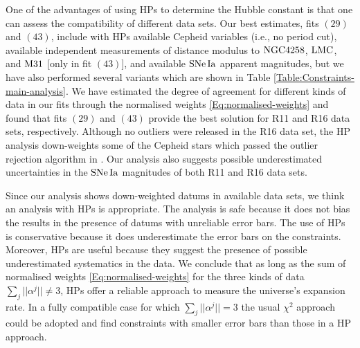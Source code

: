 One of the advantages of using HPs to determine the Hubble constant is that one can assess the compatibility of different data sets. Our best estimates, fits $(29)$ and $(43)$, include with HPs available Cepheid variables (i.e., no period cut), available independent measurements of distance modulus to $\mathrm{NGC4258}$, $\mathrm{LMC}$, and $\mathrm{M31}$ [only in fit $(43)$], and available $\mathrm{SNe\,Ia}$ apparent magnitudes, but we have also performed several variants which are shown in Table \ref{Table:Constraints-main-analysis}. %
We have estimated the degree of agreement for different kinds of data in our fits through the normalised weights \eqref{Eq:normalised-weights} and found that fits $(29)$ and $(43)$ provide the best solution for R11 and R16 data sets, respectively. Although no outliers were released in the R16 data set, the HP analysis down-weights some of the Cepheid stars which passed the outlier rejection algorithm in \cite{Riess:2016jrr}. Our analysis also suggests possible underestimated uncertainties in the $\mathrm{SNe\,Ia}$ magnitudes of both R11 and R16 data sets.   

Since our analysis shows down-weighted datums in available data sets, we think an analysis with HPs is appropriate. The analysis is safe because it does not bias the results in the presence of datums with unreliable error bars. The use of HPs is conservative because it does underestimate the error bars on the constraints. Moreover, HPs are useful because they suggest the presence of possible underestimated systematics in the data. We conclude that as long as the sum of normalised weights \eqref{Eq:normalised-weights} for the three kinds of data $\sum_j || \alpha^j || \neq 3$,  HPs offer a reliable approach to measure the universe's expansion rate. In a fully compatible case for which $\sum_j || \alpha^j || = 3$ the usual $\chi^2$ approach could be adopted and find constraints with smaller error bars than those in a HP approach.  

